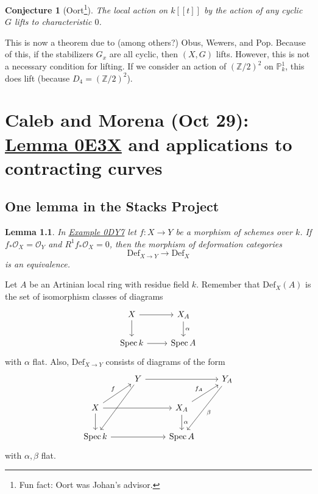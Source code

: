 \documentclass[leqno, openany]{memoir}
\newtheorem{lem}[thm]{Lemma}
\newtheorem{conj}[thm]{Conjecture}
\theoremstyle{definition}
\theoremstyle{remark}
\theoremstyle{plain}
\theoremstyle{definition}
\theoremstyle{remark}
\newcommand{\Z}{\mathbb{Z}}
\renewcommand{\P}{\mathbb{P}}
\newcommand{\mc}[1]{\mathcal{#1}}
\newcommand{\mr}[1]{\mathrm{#1}}
\DeclareMathOperator{\Spec}{Spec}
\begin{document}
\begin{conj}[Oort\footnote{Fun fact: Oort was Johan's advisor.}]
    The local action on $k[[t]]$ by the action of any cyclic $G$ lifts to characteristic $0$.
\end{conj}

This is now a theorem due to (among others?) Obus, Wewers, and Pop. Because of this, if the stabilizers $G_x$ are all cyclic, then $(X, G)$ lifts. However, this is not a necessary condition for lifting. If we consider an action of $(\Z/2)^2$ on $\P^1_k$, this does lift (because $D_4 = (\Z/2)^2$).

\chapter{Caleb and Morena (Oct 29): \href{https://stacks.math.columbia.edu/tag/0E3X}{Lemma 0E3X} and applications to contracting curves}%
\label{cha:caleb_and_morena_oct_29_https_lemma_0e3x_and_applications_to_contracting_curves}

\section{One lemma in the Stacks Project}%
\label{sec:one_lemma_in_the_stacks_project}

\begin{lem}
    In \href{https://stacks.math.columbia.edu/tag/0DY7}{Example 0DY7} let $f \colon X \to Y$ be a morphism of schemes over $k$. If $f_* \mc{O}_X = \mc{O}_Y$ and $R^1 f_* \mc{O}_X = 0$, then the morphism of deformation categories
    \[ \mr{Def}_{X \to Y} \to \mr{Def}_X \]
    is an equivalence.
\end{lem}

Let $A$ be an Artinian local ring with residue field $k$. Remember that $\mr{Def}_X(A)$ is the set of isomorphism classes of diagrams 
\begin{equation}
\begin{tikzcd}
    X \ar{r} \ar{d} & X_A \ar{d}{\alpha} \\
    \Spec k \ar{r} & \Spec A
\end{tikzcd}
\end{equation}
with $\alpha$ flat. Also, $\mr{Def}_{X \to Y}$ consists of diagrams of the form
\begin{equation*}
\begin{tikzcd}
    & Y \ar{rr} \ar{ddl} & & Y_A \ar{ddl}{\beta} \\
    X \ar{ur}{f} \ar{rr} \ar{d} & & X_A \ar{ur}{f_A} \ar{d}{\alpha} \\
    \Spec k \ar{rr} & & \Spec A
\end{tikzcd}
\end{equation*}
with $\alpha, \beta$ flat.
\end{document}
